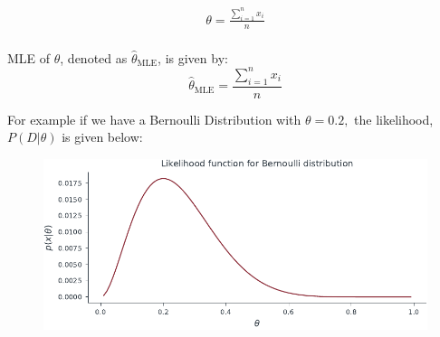 \documentclass[handout]{beamer}
\begin{document}
    \begin{frame}
            
        \begin{align*}
            \theta=\frac{\sum_{i=1}^n x_{i}}{n}\\
        \end{align*}
        \begin{tcolorbox}[colback=metropolisblue!5,colframe=metropolisblue,title=Maximum Likelihood Estimate for $\theta$]
            MLE of $\theta$, denoted as $\hat{\theta}_{\text{MLE}}$, is given by:
            \begin{equation*}
                \hat{\theta}_{\text{MLE}} = \frac{\sum_{i=1}^n x_{i}}{n}
            \end{equation*}
        \end{tcolorbox}
        
        \end{frame}
    
    \begin{frame}
    For example if we have a Bernoulli Distribution with $\theta=0.2,$ the likelihood, $P(D|\theta)$ is given below:
    \begin{figure}
                    \centerline{\includegraphics[scale = 0.75]{../figures/mle/bernoulli_likelihood.pdf}}
    \end{figure}
        
    \end{frame}
\end{document}
